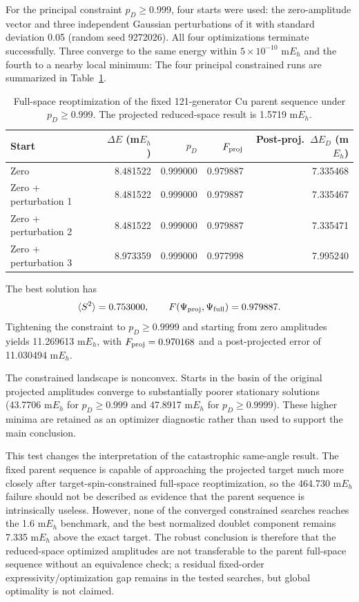 \documentclass[
 aip,
 jcp,
 amsmath,amssymb,
 preprint
]{revtex4-2}
\begin{document}
For the principal constraint $p_D\ge0.999$, four starts were used: the zero-amplitude vector and three independent Gaussian perturbations of it with standard deviation 0.05 (random seed 9272026).
All four optimizations terminate successfully.
Three converge to the same energy within $5\times10^{-10}$ m$E_h$ and the fourth to a nearby local minimum:
The four principal constrained runs are summarized in Table~\ref{tab:fixed_parent_reopt}.
\begin{table}[htbp]
\centering
\small
\caption{Full-space reoptimization of the fixed 121-generator Cu parent sequence under $p_D\ge0.999$. The projected reduced-space result is 1.5719 m$E_h$.}
\label{tab:fixed_parent_reopt}
\begin{tabular}{lrrrr}
\toprule
Start & $\Delta E$ (m$E_h$) & $p_D$ & $F_{\rm proj}$ & Post-proj.\ $\Delta E_D$ (m$E_h$)\\
\midrule
Zero & 8.481522 & 0.999000 & 0.979887 & 7.335468\\
Zero + perturbation 1 & 8.481522 & 0.999000 & 0.979887 & 7.335467\\
Zero + perturbation 2 & 8.481522 & 0.999000 & 0.979887 & 7.335471\\
Zero + perturbation 3 & 8.973359 & 0.999000 & 0.977998 & 7.995240\\
\bottomrule
\end{tabular}
\end{table}

The best solution has
\begin{equation}
\langle S^2\rangle=0.753000,\qquad
F(\Psi_{\rm proj},\Psi_{\rm full})=0.979887 .
\end{equation}
Tightening the constraint to $p_D\ge0.9999$ and starting from zero amplitudes yields 11.269613 m$E_h$, with $F_{\rm proj}=0.970168$ and a post-projected error of 11.030494 m$E_h$.

The constrained landscape is nonconvex.
Starts in the basin of the original projected amplitudes converge to substantially poorer stationary solutions (43.7706 m$E_h$ for $p_D\ge0.999$ and 47.8917 m$E_h$ for $p_D\ge0.9999$).
These higher minima are retained as an optimizer diagnostic rather than used to support the main conclusion.

This test changes the interpretation of the catastrophic same-angle result.
The fixed parent sequence is capable of approaching the projected target much more closely after target-spin-constrained full-space reoptimization, so the 464.730 m$E_h$ failure should not be described as evidence that the parent sequence is intrinsically useless.
However, none of the converged constrained searches reaches the 1.6 m$E_h$ benchmark, and the best normalized doublet component remains 7.335 m$E_h$ above the exact target.
The robust conclusion is therefore that the reduced-space optimized amplitudes are not transferable to the parent full-space sequence without an equivalence check; a residual fixed-order expressivity/optimization gap remains in the tested searches, but global optimality is not claimed.
\end{document}

